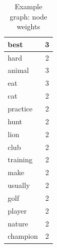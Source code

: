\documentclass[a4paper, 12pt, oneside]{Thesis} %
\begin{document}
\begin{table}[th]
\centering
 \begin{tabular}{| p{6cm} | c |}
 \hline
 best &  3 \\ \hline
 hard &  2 \\ \hline
 animal &  3 \\ \hline
 eat &  3 \\ \hline
 cat &  2 \\ \hline
 practice &  2 \\ \hline
 hunt &  2 \\ \hline
 lion &  2 \\ \hline
 club &  2 \\ \hline
 training &  2 \\ \hline
 make &  2 \\ \hline
 usually &  2 \\ \hline
 golf &  2 \\ \hline
 player &  2 \\ \hline
 nature &  2 \\ \hline
 champion &  2 \\ \hline
\end{tabular}
\caption{Example graph: node weights}
\label{tab:nodeweights}
\end{table}
\end{document}
